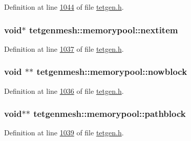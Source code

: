 Definition at line \hyperlink{tetgen_8h_source_l01044}{1044} of file \hyperlink{tetgen_8h_source}{tetgen.\+h}.

\subsubsection[{\texorpdfstring{nextitem}{nextitem}}]{\setlength{\rightskip}{0pt plus 5cm}void$\ast$ tetgenmesh\+::memorypool\+::nextitem}\hypertarget{classtetgenmesh_1_1memorypool_ab0864200773e9371db60d190fb0c3cf7}{}\label{classtetgenmesh_1_1memorypool_ab0864200773e9371db60d190fb0c3cf7}


Definition at line \hyperlink{tetgen_8h_source_l01037}{1037} of file \hyperlink{tetgen_8h_source}{tetgen.\+h}.

\subsubsection[{\texorpdfstring{nowblock}{nowblock}}]{\setlength{\rightskip}{0pt plus 5cm}void $\ast$$\ast$ tetgenmesh\+::memorypool\+::nowblock}\hypertarget{classtetgenmesh_1_1memorypool_a63e80bcff81323ea491bfa189c15879b}{}\label{classtetgenmesh_1_1memorypool_a63e80bcff81323ea491bfa189c15879b}


Definition at line \hyperlink{tetgen_8h_source_l01036}{1036} of file \hyperlink{tetgen_8h_source}{tetgen.\+h}.

\subsubsection[{\texorpdfstring{pathblock}{pathblock}}]{\setlength{\rightskip}{0pt plus 5cm}void$\ast$$\ast$ tetgenmesh\+::memorypool\+::pathblock}\hypertarget{classtetgenmesh_1_1memorypool_a6830e3c672f7a7546c2ea0ed70b2ac38}{}\label{classtetgenmesh_1_1memorypool_a6830e3c672f7a7546c2ea0ed70b2ac38}


Definition at line \hyperlink{tetgen_8h_source_l01039}{1039} of file \hyperlink{tetgen_8h_source}{tetgen.\+h}.

